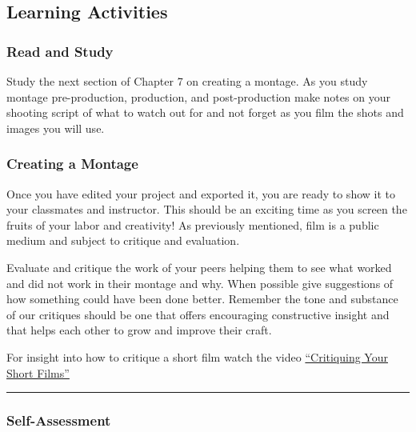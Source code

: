 \documentclass[
]{book}
\begin{document}
\hypertarget{learning-activities-4}{%
\subsection*{Learning Activities}\label{learning-activities-4}}

\begin{reflect}
\hypertarget{read-and-study}{%
\subsubsection*{Read and Study}\label{read-and-study}}

Study the next section of Chapter 7 on creating a montage. As you study montage pre-production, production, and post-production make notes on your shooting script of what to watch out for and not forget as you film the shots and images you will use.

\hypertarget{creating-a-montage}{%
\subsubsection*{Creating a Montage}\label{creating-a-montage}}

Once you have edited your project and exported it, you are ready to show it to your classmates and instructor. This should be an exciting time as you screen the fruits of your labor and creativity! As previously mentioned, film is a public medium and subject to critique and evaluation.

Evaluate and critique the work of your peers helping them to see what worked and did not work in their montage and why. When possible give suggestions of how something could have been done better. Remember the tone and substance of our critiques should be one that offers encouraging constructive insight and that helps each other to grow and improve their craft.

For insight into how to critique a short film watch the video \href{https://www.youtube.com/watch?v=x5ASDkOSIBE}{``Critiquing Your Short Films''}

\begin{center}\rule{0.5\linewidth}{0.5pt}\end{center}

\hypertarget{self-assessment}{%
\subsubsection*{Self-Assessment}\label{self-assessment}}


\end{reflect}
\end{document}
